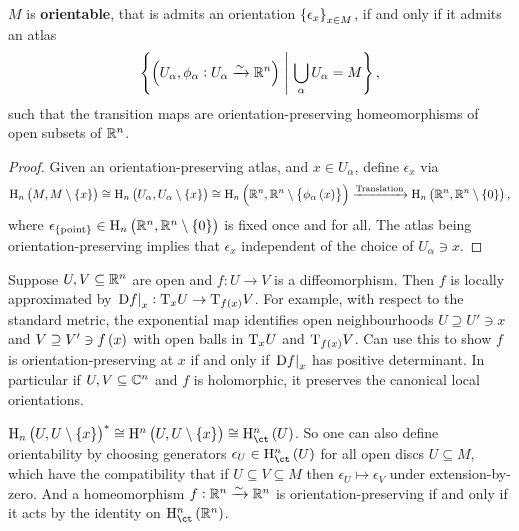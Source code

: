 \begin{lemma}
$ M $ is \textbf{orientable}, that is admits an orientation $ \cbr{\epsilon_x}_{x \in M} $, if and only if it admits an atlas
$$ \cbr{\br{U_\alpha, \phi_\alpha : U_\alpha \xrightarrow{\sim} \RR^n} \st \bigcup_\alpha U_\alpha = M}, $$
such that the transition maps are orientation-preserving homeomorphisms of open subsets of $ \mathbb{R}^n $.
\end{lemma}

\begin{proof}
Given an orientation-preserving atlas, and $ x \in U_\alpha $, define $ \epsilon_x $ via
$$ \H_n\br{M, M \setminus \cbr{x}} \cong \H_n\br{U_\alpha, U_\alpha \setminus \cbr{x}} \cong \H_n\br{\RR^n, \RR^n \setminus \cbr{\phi_\alpha\br{x}}} \xrightarrow{\text{Translation}} \H_n\br{\RR^n, \RR^n \setminus \cbr{0}}, $$
where $ \epsilon_{\pt} \in \H_n\br{\RR^n, \RR^n \setminus \cbr{0}} $ is fixed once and for all. The atlas being orientation-preserving implies that $ \epsilon_x $ independent of the choice of $ U_\alpha \ni x $.
\end{proof}

\begin{example*}
Suppose $ U, V \subseteq \mathbb{R}^n $ are open and $ f : U \to V $ is a diffeomorphism. Then $ f $ is locally approximated by $ \eval{\D f}_x : \T_xU \to \T_{f\br{x}}V $. For example, with respect to the standard metric, the exponential map identifies open neighbourhoods $ U \supseteq U' \ni x $ and $ V \supseteq V' \ni f\br{x} $ with open balls in $ \mathrm{T}_xU $ and $ \T_{f\br{x}}V $. Can use this to show $ f $ is orientation-preserving at $ x $ if and only if $ \left. \mathrm{D} f \right|_x $ has positive determinant. In particular if $ U, V \subseteq \mathbb{C}^n $ and $ f $ is holomorphic, it preserves the canonical local orientations.
\end{example*}

\begin{remark*}
$ \H_n\br{U, U \setminus \cbr{x}}^* \cong \H^n\br{U, U \setminus \cbr{x}} \cong \Hc^n\br{U} $. So one can also define orientability by choosing generators $ \epsilon_U \in \Hc^n\br{U} $ for all open discs $ U \subseteq M $, which have the compatibility that if $ U \subseteq V \subseteq M $ then $ \epsilon_U \mapsto \epsilon_V $ under extension-by-zero. And a homeomorphism $ f : \mathbb{R}^n \xrightarrow{\sim} \mathbb{R}^n $ is orientation-preserving if and only if it acts by the identity on $ \Hc^n\br{\RR^n} $.
\end{remark*}

\pagebreak

